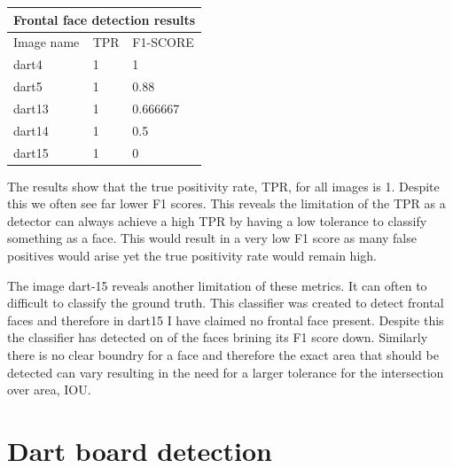 \documentclass{article}
\begin{document}
\bigskip

\begin{tabular}{ |p{3cm}||p{3cm}|p{3cm}| }
 \hline
 \multicolumn{3}{|c|}{Frontal face detection results} \\
 \hline
 Image name & TPR & F1-SCORE \\
 \hline
 dart4  & 1   & 1         \\
 dart5  & 1   & 0.88      \\
 dart13 & 1   & 0.666667  \\ 
 dart14 & 1   & 0.5       \\ 
 dart15 & 1   & 0         \\ 
 \hline
\end{tabular}

\bigskip

The results show that the true positivity rate, TPR, for all images is 1.
Despite this we often see far lower F1 scores. This reveals the limitation of
the TPR as a detector can always achieve a high TPR by having a low tolerance
to classify something as a face. This would result in a very low F1 score as
many false positives would arise yet the true positivity rate would remain
high.

The image dart-15 reveals another limitation of these metrics. It can often to
difficult to classify the ground truth. This classifier was created to detect
frontal faces and therefore in dart15 I have claimed no frontal face present.
Despite this the classifier has detected on of the faces brining its F1 score
down. Similarly there is no clear boundry for a face and therefore the exact
area that should be detected can vary resulting in the need for a larger
tolerance for the intersection over area, IOU.

\section{Dart board detection}

\end{document}
